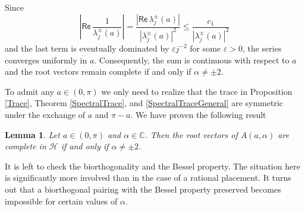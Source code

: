 \documentclass[11pt, a4paper,reqno]{amsart}
\theoremstyle{plain}
\newtheorem{lemma}[theorem]{Lemma}
\theoremstyle{definition}
\theoremstyle{remark}
\renewcommand{\leq}{\leqslant}	\renewcommand{\geq}{\geqslant}
\newcommand{\1}{\mathds 1}
\renewcommand{\Re}{\mathsf{Re}\,}
\begin{document}
Since 
\[
\left|\Re \frac{1}{\lambda_j^\pm(a)}\right| = \frac{\left|\Re \lambda_j^\pm(a)\right|}{|\lambda_j^\pm(a)|^2} \leq \frac{c_1}{|\lambda_j^\pm(a)|^2}
\]
and the last term is eventually dominated by $\varepsilon j^{-2}$ for some $\varepsilon >0$, the series converges uniformly in $a$. Consequently, the sum is continuous with respect to $a$ and the root vectors remain complete if and only if $\alpha \neq \pm 2$.

To admit any $a \in (0, \pi)$ we only need to realize that the trace in Proposition \ref{Trace}, Theorem \ref{SpectralTrace}, and \eqref{SpectralTraceGeneral} are symmetric under the exchange of $a$ and $\pi-a$. We have proven the following result

\begin{lemma}\label{L: Total condition}
    Let $a \in (0, \pi)$ and $\alpha \in \mathbb C$. Then the root vectors of $A(a, \alpha)$ are complete in $\mathcal H$ if and only if $\alpha \neq \pm 2$.
\end{lemma}

It is left to check the biorthogonality and the Bessel property. The situation here is significantly more involved than in the case of a rational placement. It turns out that a biorthogonal pairing with the Bessel property preserved becomes impossible for certain values of $\alpha$.
\end{document}

